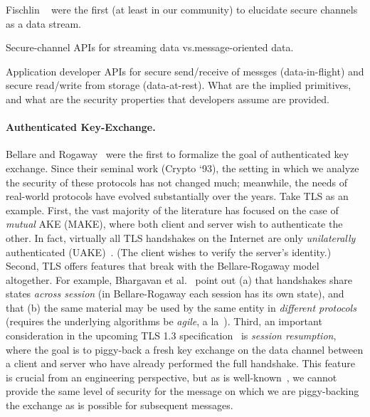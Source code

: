 Fischlin \etal~\cite{FPMG15} were the first (at least in our community) to
elucidate secure channels as a data stream. 

\begin{task}
Secure-channel APIs for streaming data vs.message-oriented data. 
\end{task}

\begin{task}
Application developer APIs for secure send/receive of messges
(data-in-flight) and secure read/write from storage (data-at-rest).  What are
the implied primitives, and what are the security properties that developers
assume are provided.
\end{task}

\paragraph{Authenticated Key-Exchange. } 
    Bellare and Rogaway~\cite{bellare1993entity} were the first to formalize the
    goal of authenticated key exchange. Since their seminal work (Crypto `93),
    the setting in which we analyze the security of these protocols has not
    changed much; meanwhile, the needs of real-world protocols have evolved
    substantially over the years. Take TLS as an example.
    First, the vast majority of the literature has focused on the case of
    \emph{mutual} AKE (MAKE), where both client and server wish to authenticate the
    other. In fact, virtually all TLS handshakes on the Internet are only
    \emph{unilaterally} authenticated (UAKE)~\cite{xxx}. (The client
    wishes to verify the server's identity.)
    Second, TLS offers features that break with the Bellare-Rogaway model
    altogether. For example, Bhargavan et al.~\cite{bhargavan2014proving} point
    out (a) that handshakes share states \emph{across session} (in
    Bellare-Rogaway each session has its own state), and that (b) the same
    material may be used by the same entity in \emph{different protocols}
    (requires the underlying algorithms be \emph{agile}, a
    la~\cite{acar2010cryptographic}).
    Third, an important consideration in the upcoming TLS 1.3
    specification~\cite{tls13} is \emph{session resumption}, where the goal is
    to piggy-back a fresh key exchange on the data channel between a client and
    server who have already performed the full handshake. This feature is
    crucial from an engineering perspective, but as is well-known~\cite{xxx}, we
    cannot provide the same level of security for the message on which we are
    piggy-backing the exchange as is possible for subsequent messages.

